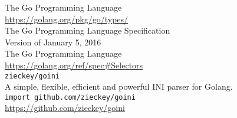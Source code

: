 \documentclass[12pt,letterpaper,dvips]{article}
\begin{document}
\noindent The Go Programming Language\\
\href{https://golang.org/pkg/go/types/}{https://golang.org/pkg/go/types/}
\\

\noindent The Go Programming Language Specification\\
Version of January 5, 2016\\
The Go Programming Language\\
\href{https://golang.org/ref/spec\#Selectors}{https://golang.org/ref/spec\#Selectors}
\\


\newpage
\noindent \texttt{zieckey/goini}\\
A simple, flexible, efficient and powerful INI parser for Golang.\\
\texttt{import github.com/zieckey/goini}\\
\href{https://github.com/zieckey/goini}{https://github.com/zieckey/goini}
\end{document}
